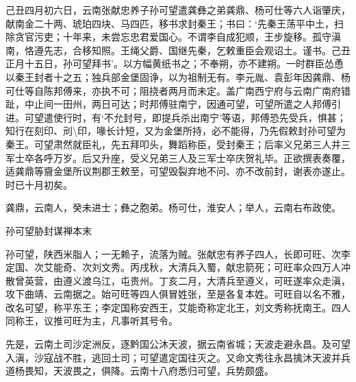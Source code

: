 \documentclass[]{article}
\begin{document}
己丑四月初六日，云南张献忠养子孙可望遣龚彝之弟龚鼎、杨可仕等六人诣肇庆，献南金二十两、琥珀四块、马四匹，移书求封秦王；书曰：`先秦王荡平中土，扫除贪官污吏；十年来，未尝忘忠君爱国心。不谓李自成犯顺，王步旋移。孤守滇南，恪遵先志，合移知照。王绳父爵、国继先秦，乞敕重臣会观诏土。谨书。己丑正月十五日，孙可望拜书'。以方幅黄纸书之；不奉朔，亦不建朔。一时群臣怂恿以秦王封者十之五；独兵部金堡固诤，以为祖制无有。李元胤、袁彭年因龚鼎、杨可仕等自陈邦傅来，亦执不可；阻挠者两月而未定。盖广南西宁府与云南广南府错趾，中止间一田州，两日可达；时邦傅驻南宁，因通可望，可望所遣之人邦傅引进。可望遣使行时，有`不允封号，即提兵杀出南宁'等语，邦傅恐先受兵，惧甚；知行在刻印、刓\textbackslash{}印，喙长计短，又为金堡所持，必不能得，乃先假敕封孙可望为秦王。可望肃然就臣礼，先五拜叩头，舞蹈称臣，受封秦王；后率义兄弟三人并三军士卒各呼万岁。后又升座，受义兄弟三人及三军士卒庆贺礼毕。正欲撰表奏覆，适龚鼎等齎金堡所议荆郡王敕至，可望毁裂弃地不问、亦不改前封，谢表亦遂止。时已十月初矣。

龚鼎，云南人，癸未进士；彝之胞弟。杨可仕，淮安人；举人，云南右布政使。

孙可望胁封谋禅本末

孙可望，陕西米脂人；一无赖子，流落为贼。张献忠有养子四人，长即可旺、次李定国、次艾能奇、次刘文秀。丙戌秋，大清兵入蜀，献忠箭死；可旺率众四万人冲散曾英营，由遵义渡乌江，屯贵州。丁亥二月，大清兵至遵义，可旺遂率众走滇，攻下曲靖、云南据之。始可旺等四人俱冒姓张，至是各复本姓。可旺自以名不雅，改名可望，称平东王；李定国称安西王，艾能奇称定北王，刘文秀称抚南王。四人同称王，议推可旺为主，凡事听其号令。

先是，云南土司沙定洲反，逐黔国公沐天波，据云南省城；天波走避永昌。及可望入滇，沙寇战不胜，逃回土司；可望遣定国往灭之。又命文秀往永昌擒沐天波并兵道杨畏知，天波畏之，俱降。云南十八府悉归可望，兵势颇盛。
\end{document}
